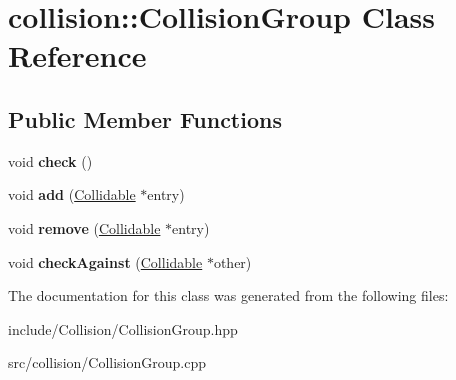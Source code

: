\hypertarget{classcollision_1_1_collision_group}{}\section{collision\+:\+:Collision\+Group Class Reference}
\label{classcollision_1_1_collision_group}
\subsection*{Public Member Functions}
\begin{DoxyCompactItemize}
\item 
\hypertarget{classcollision_1_1_collision_group_ad15ac7665871c1860c90c82911a27b4d}{}void {\bfseries check} ()\label{classcollision_1_1_collision_group_ad15ac7665871c1860c90c82911a27b4d}

\item 
\hypertarget{classcollision_1_1_collision_group_a70cb9c98b802edd530f14854e2589221}{}void {\bfseries add} (\hyperlink{classcollision_1_1_collidable}{Collidable} $\ast$entry)\label{classcollision_1_1_collision_group_a70cb9c98b802edd530f14854e2589221}

\item 
\hypertarget{classcollision_1_1_collision_group_a56c2f03573545ca1508199511a45b00c}{}void {\bfseries remove} (\hyperlink{classcollision_1_1_collidable}{Collidable} $\ast$entry)\label{classcollision_1_1_collision_group_a56c2f03573545ca1508199511a45b00c}

\item 
\hypertarget{classcollision_1_1_collision_group_ab90f333c016c808931d2866dfcb4a67f}{}void {\bfseries check\+Against} (\hyperlink{classcollision_1_1_collidable}{Collidable} $\ast$other)\label{classcollision_1_1_collision_group_ab90f333c016c808931d2866dfcb4a67f}

\end{DoxyCompactItemize}


The documentation for this class was generated from the following files\+:\begin{DoxyCompactItemize}
\item 
include/\+Collision/Collision\+Group.\+hpp\item 
src/collision/Collision\+Group.\+cpp\end{DoxyCompactItemize}
